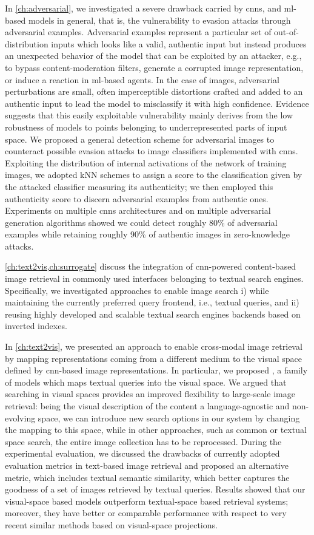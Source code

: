 In \ref{ch:adversarial}, we investigated a severe drawback carried by \glspl{cnn}, and \gls{ml}-based models in general, that is, the vulnerability to evasion attacks through adversarial examples.
Adversarial examples represent a particular set of out-of-distribution inputs which looks like a valid, authentic input but instead produces an unexpected behavior of the model that can be exploited by an attacker, e.g., to bypass content-moderation filters, generate a corrupted image representation, or induce a reaction in \gls{ml}-based agents.
In the case of images, adversarial perturbations are small, often imperceptible distortions crafted and added to an authentic input to lead the model to misclassify it with high confidence.
Evidence suggests that this easily exploitable vulnerability mainly derives from the low robustness of models to points belonging to underrepresented parts of input space.
We proposed a general detection scheme for adversarial images to counteract possible evasion attacks to image classifiers implemented with \glspl{cnn}.
Exploiting the distribution of internal activations of the network of training images, we adopted kNN schemes to assign a score to the classification given by the attacked classifier measuring its authenticity;
we then employed this authenticity score to discern adversarial examples from authentic ones.
Experiments on multiple \glspl{cnn} architectures and on multiple adversarial generation algorithms showed we could detect roughly 80\% of adversarial examples while retaining roughly 90\% of authentic images in zero-knowledge attacks.

\ref{ch:text2vis,ch:surrogate} discuss the integration of \gls{cnn}-powered content-based image retrieval in commonly used interfaces belonging to textual search engines.
Specifically, we investigated approaches to enable image search i) while maintaining the currently preferred query frontend, i.e., textual queries, and ii) reusing highly developed and scalable textual search engines backends based on inverted indexes.

In \ref{ch:text2vis}, we presented an approach to enable cross-modal image retrieval by mapping representations coming from a different medium to the visual space defined by \gls{cnn}-based image representations.
In particular, we proposed \ttv{}, a family of models which maps textual queries into the visual space.
We argued that searching in visual spaces provides an improved flexibility to large-scale image retrieval: being the visual description of the content a language-agnostic and non-evolving space, we can introduce new search options in our system by changing the mapping to this space, while in other approaches, such as common or textual space search, the entire image collection has to be reprocessed.
During the experimental evaluation, we discussed the drawbacks of currently adopted evaluation metrics in text-based image retrieval and proposed an alternative metric, which includes textual semantic similarity, which better captures the goodness of a set of images retrieved by textual queries.
Results showed that our visual-space based models outperform textual-space based retrieval systems;
moreover, they have better or comparable performance with respect to very recent similar methods based on visual-space projections.

